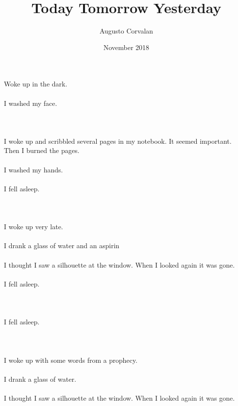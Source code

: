 \documentclass{article}
\title{Today Tomorrow Yesterday}
\date{November 2018}
\author{Augusto Corvalan}
\begin{document}
    \maketitle
    
    \section{}
    Woke up in the dark.\\\\I washed my face.\\\\ 
    \newpage
    
    \section{}
    I woke up and scribbled several pages in my notebook. It seemed important. Then I burned the pages.\\\\I washed my hands.\\\\I fell asleep.\\\\ 
    \newpage
    
    \section{}
    I woke up very late.\\\\I drank a glass of water and an aspirin\\\\I thought I saw a silhouette at the window. When I looked again it was gone.\\\\I fell asleep.\\\\ 
    \newpage
    
    \section{}
    I fell asleep.\\\\ 
    \newpage
    
    \section{}
    I woke up with some words from a prophecy.\\\\I drank a glass of water.\\\\I thought I saw a silhouette at the window. When I looked again it was gone.\\\\ 
    \newpage
    
\end{document}
